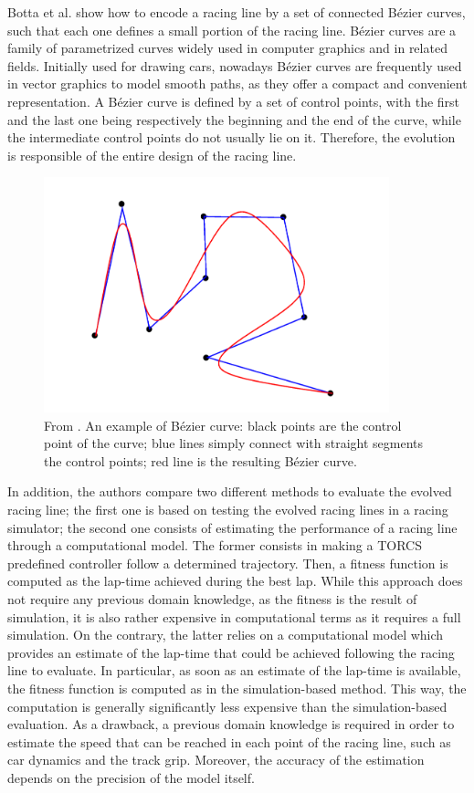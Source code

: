 Botta et al. \cite{botta} show how to encode a racing line by a set of connected B\'{e}zier curves, such that each one defines a small portion of the racing line. B\'{e}zier curves are a family of parametrized curves widely used in computer graphics and in related fields. Initially used for drawing cars, nowadays B\'{e}zier curves are frequently used in vector graphics to model smooth paths, as they offer a compact and convenient representation.
A B\'{e}zier curve is defined by a set of control points, with the first and the last one being respectively the beginning and the end of the curve, while the intermediate control points do not usually lie on it. Therefore, the evolution is responsible of the entire design of the racing line.  
  \begin{figure}
    \centering
 	  \captionsetup{width=10cm}
      \includegraphics[width=10cm]{./img/bezier}
     \caption{From \cite{botta}. An example of B\'{e}zier curve: black points are the control point of the curve; blue lines simply connect with straight segments the control points; red line is the resulting B\'{e}zier curve.}
  \end{figure}
In addition, the authors compare two different methods to evaluate the evolved racing line; the first one is based on testing the evolved racing lines in a racing simulator; the second one consists of estimating the performance of a racing line through a computational model.
The former consists in making a TORCS predefined controller follow a determined trajectory. Then, a fitness function is computed as the lap-time achieved during the best lap. While this approach does not require any previous domain knowledge, as the fitness is the result of simulation, it is also rather expensive in computational terms as it requires a full simulation. 
On the contrary, the latter relies on a computational model which provides an estimate of the lap-time
that could be achieved following the racing line to evaluate. In particular, as soon as an estimate of the lap-time is available, the fitness function is computed as in the simulation-based method. This way, the computation is generally significantly less expensive than the simulation-based evaluation. As a drawback, a previous domain knowledge is required in order to estimate the speed that can be reached in each point of the racing line, such as car dynamics and the track grip. Moreover, the accuracy of the estimation depends on the precision of the model itself.

